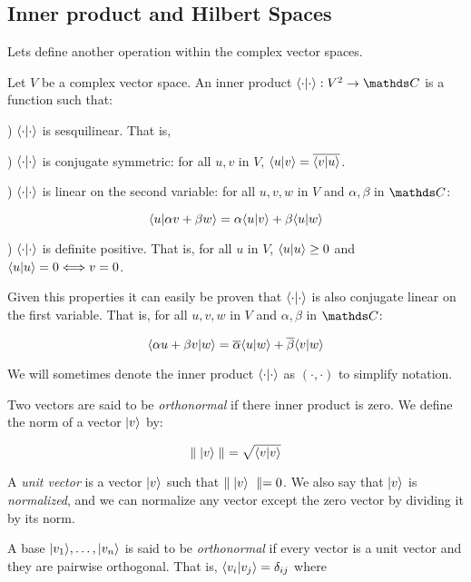 \subsection{Inner product and Hilbert Spaces}


Lets define another operation within the complex vector spaces.

\begin{definition}
	Let $V$ be a complex vector space. An inner product $\la \cdot | \cdot \ra: V^2 \rightarrow \C$ is a function such that:
	
	) $\langle \cdot | \cdot \rangle$ is sesquilinear. That is,
	
	) $\langle \cdot | \cdot \rangle$ is conjugate symmetric: for all $u,v$ in $V$, $\langle u | v \rangle = \overline{\langle v | u \rangle}$.
	
	) $\langle \cdot | \cdot \rangle$ is linear on the second variable: for all $u,v,w$ in $V$ and $\alpha, \beta$ in $\C$:
	
	$$ \langle u  | \alpha v + \beta w \rangle = \alpha \langle u | v \rangle + \beta \langle u | w \rangle $$
	
	) $\langle \cdot | \cdot \rangle$ is definite positive. That is, for all $u$ in $V$, $\langle u | u \rangle \geq 0$ and $\langle u | u \rangle = 0 \Longleftrightarrow v = 0$.
\end{definition}

Given this properties it can easily be proven that $\langle \cdot | \cdot \rangle$ is also conjugate linear on the first variable. That is, for all $u,v,w$ in $V$ and $\alpha, \beta$ in $\C$:

$$ \langle \alpha u + \beta v  | w \rangle = \overline{\alpha} \langle u | w \rangle + \overline{\beta} \langle v | w \rangle $$

We will sometimes denote the inner product $\langle \cdot | \cdot \rangle$ as $( \cdot , \cdot )$ to simplify notation.

Two vectors are said to be \emph{orthonormal} if there inner product is zero. We define the norm of a vector $|v\rangle$ by:

$$\parallel |v\rangle \parallel \ = \sqrt{ \langle v|v\rangle }$$

A \emph{unit vector} is a vector $|v\rangle$ such that $\parallel |v\rangle \  \parallel = 0 $. We also say that $|v\rangle$ is \emph{normalized}, and we can normalize any vector except the zero vector by dividing it by its norm.

A base $|v_1\rangle, \dotsc, |v_n\rangle$ is said to be \emph{orthonormal} if every vector is a unit vector and they are pairwise orthogonal. That is, $\langle v_i|v_j\rangle = \delta_{ij}$ where

